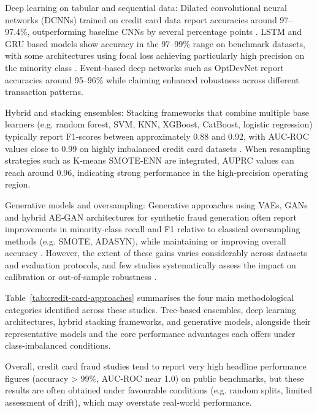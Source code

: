 \documentclass[a4paper,fleqn]{cas-dc}
\begin{document}
Deep learning on tabular and sequential data: Dilated convolutional neural networks (DCNNs) trained on credit card data report accuracies around 97–97.4\%, outperforming baseline CNNs by several percentage points \cite{karthika_smart_2023}. 
LSTM and GRU based models show accuracy in the 97–99\% range on benchmark datasets, with some architectures using focal loss achieving particularly high precision on the minority class \cite{krishnavardhan_intelligent_2024}. 
Event‑based deep networks such as OptDevNet report accuracies around 95–96\% while claiming enhanced robustness across different transaction patterns.

Hybrid and stacking ensembles: Stacking frameworks that combine multiple base learners (e.g. random forest, SVM, KNN, XGBoost, CatBoost, logistic regression) typically report F1‑scores between approximately 0.88 and 0.92, with AUC‑ROC values close to 0.99 on highly imbalanced credit card datasets \cite{leevy_threshold_2023, breskuviene_categorical_2023, khalid_enhancing_2024}. 
When resampling strategies such as K‑means SMOTE‑ENN are integrated, AUPRC values can reach around 0.96, indicating strong performance in the high‑precision operating region.

Generative models and oversampling: Generative approaches using VAEs, GANs and hybrid AE‑GAN architectures for synthetic fraud generation often report improvements in minority‑class recall and F1 relative to classical oversampling methods (e.g. SMOTE, ADASYN), while maintaining or improving overall accuracy \cite{chen_variational_2021, ferreira_when_2021, zhi_research_2025}. 
However, the extent of these gains varies considerably across datasets and evaluation protocols, and few studies systematically assess the impact on calibration or out‑of‑sample robustness \cite{tayebi_generative_2025, ferreira_when_2021, zhang_multi-view_2025, zhi_research_2025}.

Table~\ref{tab:credit-card-approaches} summarises the four main methodological categories identified across these studies. Tree-based ensembles, deep learning architectures, hybrid stacking frameworks, and generative models, alongside their representative models and the core performance advantages each offers under class-imbalanced conditions.

Overall, credit card fraud studies tend to report very high headline performance figures (accuracy > 99\%, AUC‑ROC near 1.0) on public benchmarks, but these results are often obtained under favourable conditions (e.g. random splits, limited assessment of drift), which may overstate real‑world performance.
\end{document}
